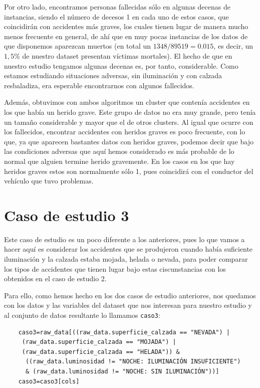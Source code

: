 \documentclass[a4paper,11pt]{book}
\begin{document}
Por otro lado, encontramos personas fallecidas sólo en algunas decenas de instancias, siendo el número de decesos 1 en cada uno de estos casos, que coincidirán con accidentes más graves, los cuales tienen lugar de manera mucho menos frecuente en general, de ahí que en muy pocas instancias de los datos de que disponemos aparezcan muertos (en total un $1348/89519=0.015$, es decir, un $1,5\%$ de nuestro dataset presentan víctimas mortales). El hecho de que en nuestro estudio tengamos algunas decenas es, por tanto, considerable. Como estamos estudiando situaciones adversas, sin iluminación y con calzada resbaladiza, era esperable encontrarnos con algunos fallecidos. 

Además, obtuvimos con ambos algoritmos un cluster que contenía accidentes en los que había un herido grave. Este grupo de datos no era muy grande, pero tenía un tamaño considerable y mayor que el de otros clusters. Al igual que ocurre con los fallecidos, encontrar accidentes con heridos graves es poco frecuente, con lo que, ya que aparecen bastantes datos con heridos graves, podemos decir que bajo las condiciones adversas que aquí hemos considerado es más probable de lo normal que alguien termine herido gravemente. En los casos en los que hay heridos graves estos son normalmente sólo 1, pues coincidirá con el conductor del vehículo que tuvo problemas.
\newpage
\section{Caso de estudio 3}
Este caso de estudio es un poco diferente a los anteriores, pues lo que vamos a hacer aquí es considerar los accidentes que se produjeron cuando había suficiente iluminación y la calzada estaba mojada, helada o nevada, para poder comparar los tipos de accidentes que tienen lugar bajo estas ciscunstancias con los obtenidos en el caso de estudio 2. 

Para ello, como hemos hecho en los dos casos de estudio anteriores, nos quedamos con los datos y las variables del dataset que nos interesan para nuestro estudio y al conjunto de datos resultante lo llamamos \texttt{caso3}:
\begin{verbatim}
	caso3=raw_data[((raw_data.superficie_calzada == "NEVADA") |
	 (raw_data.superficie_calzada == "MOJADA") | 
	 (raw_data.superficie_calzada == "HELADA")) &
	  ((raw_data.luminosidad != "NOCHE: ILUMINACIÓN INSUFICIENTE") 
	  & (raw_data.luminosidad != "NOCHE: SIN ILUMINACIÓN"))]
	caso3=caso3[cols]
\end{verbatim}
\end{document}
